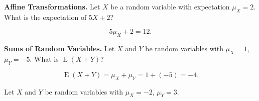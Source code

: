 \documentclass[answers,11pt]{exam}
\DeclareMathOperator*{\E}{E}
\begin{document}
\begin{questions}
\begin{parts}


\end{parts}

\newpage


\question \textbf{Affine Transformations.}
Let $X$ be a random variable with expectation $\mu_X = 2$.  What is the
expectation of $5 X + 2$?

\begin{solution}
\[
  5 \mu_X + 2 = 12.
\]
\end{solution}


\question \textbf{Sums of Random Variables.}
Let $X$ and $Y$ be random variables with $\mu_X = 1$, 
$\mu_Y = -5$.  What is $\E(X + Y)$?

\begin{solution}
\[
  \E(X + Y) = \mu_X + \mu_Y = 1 + (-5) = -4.
\]
\end{solution}



\question Let $X$ and $Y$ be random variables with $\mu_X = -2$, $\mu_Y = 3$.

\end{questions}
\end{document}
